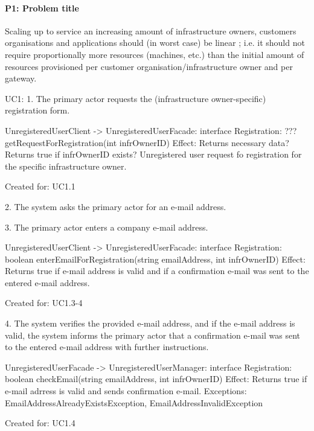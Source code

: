     \paragraph{P1: Problem title}
        Scaling up to service an increasing amount of infrastructure owners,
        customers organisations and applications should (in worst case) be linear ;
        i.e. it should not require proportionally more resources (machines, etc.)
        than the initial amount of resources provisioned per customer
        organisation/infrastructure owner and per gateway.


    UC1:
        1. The primary actor requests the (infrastructure owner-specific) registration form.

            UnregisteredUserClient -> UnregisteredUserFacade: interface Registration:
                                             ??? getRequestForRegistration(int infrOwnerID)
                Effect: Returns necessary data?
                        Returns true if infrOwnerID exists?
                        Unregistered user request fo registration for the specific infrastructure owner.
                \item Created for: UC1.1

        2. The system asks the primary actor for an e-mail address.

        3. The primary actor enters a company e-mail address.

            UnregisteredUserClient -> UnregisteredUserFacade: interface Registration:
                                        boolean enterEmailForRegistration(string emailAddress, int infrOwnerID)
                Effect: Returns true if e-mail address is valid and if a confirmation e-mail was sent to the entered e-mail address.
                \item Created for: UC1.3-4

       4. The system verifies the provided e-mail address, and if the e-mail address is valid, the system
          informs the primary actor that a confirmation e-mail was sent to the entered e-mail address
          with further instructions.

            UnregisteredUserFacade -> UnregisteredUserManager: interface Registration:
                                      boolean checkEmail(string emailAddress, int infrOwnerID)
                Effect: Returns true if e-mail adrress is valid and sends confirmation e-mail.
                Exceptions: EmailAddressAlreadyExistsException, EmailAddressInvalidException
                \item Created for: UC1.4

